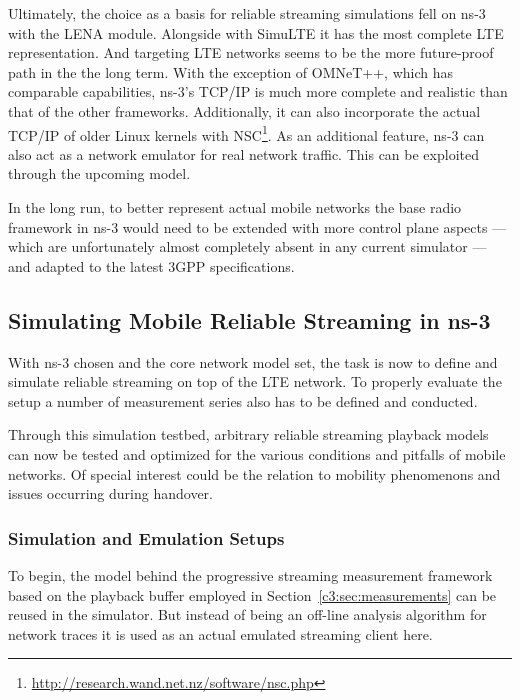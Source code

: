 Ultimately, the choice as a basis for reliable streaming simulations fell on ns-3 with the LENA module. Alongside with SimuLTE it has the most complete \gls{LTE} representation. And targeting \gls{LTE} networks seems to be the more future-proof path in the the long term. With the exception of OMNeT++, which has comparable capabilities, ns-3's \gls{TCP}/\gls{IP} is much more complete and realistic than that of the other frameworks. Additionally, it can also incorporate the actual \gls{TCP}/\gls{IP} of older Linux kernels with NSC\footnote{\url{http://research.wand.net.nz/software/nsc.php}}. As an additional feature, ns-3 can also act as a network emulator for real network traffic. This can be exploited through the upcoming model.

In the long run, to better represent actual mobile networks the base radio framework in ns-3 would need to be extended with more control plane aspects --- which are unfortunately almost completely absent in any current simulator --- and adapted to the latest \gls{3GPP} specifications.


\subsection{Simulating Mobile Reliable Streaming in ns-3}

With ns-3 chosen and the core network model set, the task is now to define and simulate reliable streaming on top of the \gls{LTE} network. To properly evaluate the setup a number of measurement series also has to be defined and conducted.

Through this simulation testbed, arbitrary reliable streaming playback models can now be tested and optimized for the various conditions and pitfalls of mobile networks. Of special interest could be the relation to mobility phenomenons and issues occurring during handover.


\subsubsection{Simulation and Emulation Setups}

To begin, the model behind the progressive streaming measurement framework based on the playback buffer employed in Section~\ref{c3:sec:measurements} can be reused in the simulator. But instead of being an off-line analysis algorithm for network traces it is used as an actual emulated streaming client here.

